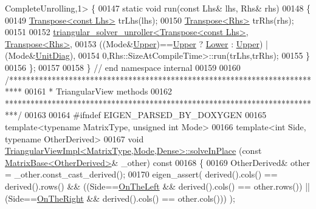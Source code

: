 \begin{DoxyCode}
      CompleteUnrolling,1> \{
00147   \textcolor{keyword}{static} \textcolor{keywordtype}{void} run(\textcolor{keyword}{const} Lhs& lhs, Rhs& rhs)
00148   \{
00149     \hyperlink{group___core___module_class_eigen_1_1_transpose}{Transpose<const Lhs>} trLhs(lhs);
00150     \hyperlink{group___core___module_class_eigen_1_1_transpose}{Transpose<Rhs>} trRhs(rhs);
00151     
00152     \hyperlink{struct_eigen_1_1internal_1_1triangular__solver__unroller}{triangular\_solver\_unroller<Transpose<const Lhs>},
      \hyperlink{group___core___module_class_eigen_1_1_transpose}{Transpose<Rhs>},
00153                               ((Mode&\hyperlink{group__enums_gga39e3366ff5554d731e7dc8bb642f83cda6bcb58be3b8b8ec84859ce0c5ac0aaec}{Upper})==\hyperlink{group__enums_gga39e3366ff5554d731e7dc8bb642f83cda6bcb58be3b8b8ec84859ce0c5ac0aaec}{Upper} ? \hyperlink{group__enums_gga39e3366ff5554d731e7dc8bb642f83cda891792b8ed394f7607ab16dd716f60e6}{Lower} : 
      \hyperlink{group__enums_gga39e3366ff5554d731e7dc8bb642f83cda6bcb58be3b8b8ec84859ce0c5ac0aaec}{Upper}) | (Mode&\hyperlink{group__enums_gga39e3366ff5554d731e7dc8bb642f83cdaddb72f888ac85d5a1c52333e54f9374b}{UnitDiag}),
00154                               0,Rhs::SizeAtCompileTime>::run(trLhs,trRhs);
00155   \}
00156 \};
00157 
00158 \} \textcolor{comment}{// end namespace internal}
00159 
00160 \textcolor{comment}{/***************************************************************************}
00161 \textcolor{comment}{* TriangularView methods}
00162 \textcolor{comment}{***************************************************************************/}
00163 
00164 \textcolor{preprocessor}{#ifndef EIGEN\_PARSED\_BY\_DOXYGEN}
00165 \textcolor{keyword}{template}<\textcolor{keyword}{typename} MatrixType, \textcolor{keywordtype}{unsigned} \textcolor{keywordtype}{int} Mode>
00166 \textcolor{keyword}{template}<\textcolor{keywordtype}{int} S\textcolor{keywordtype}{id}e, \textcolor{keyword}{typename} OtherDerived>
00167 \textcolor{keywordtype}{void} \hyperlink{class_eigen_1_1_triangular_view_impl}{TriangularViewImpl<MatrixType,Mode,Dense>::solveInPlace}
      (\textcolor{keyword}{const} \hyperlink{group___core___module_class_eigen_1_1_matrix_base}{MatrixBase<OtherDerived>}& \_other)\textcolor{keyword}{ const}
00168 \textcolor{keyword}{}\{
00169   OtherDerived& other = \_other.const\_cast\_derived();
00170   eigen\_assert( derived().cols() == derived().rows() && ((Side==\hyperlink{group__enums_ggac22de43beeac7a78b384f99bed5cee0ba129609b3bdf23b071f5f86cf2f995ec4}{OnTheLeft} && derived().cols() == 
      other.rows()) || (Side==\hyperlink{group__enums_ggac22de43beeac7a78b384f99bed5cee0ba99dc75d8e00b6c3a5bdc31940f47492b}{OnTheRight} && derived().cols() == other.cols())) );

\end{DoxyCode}
